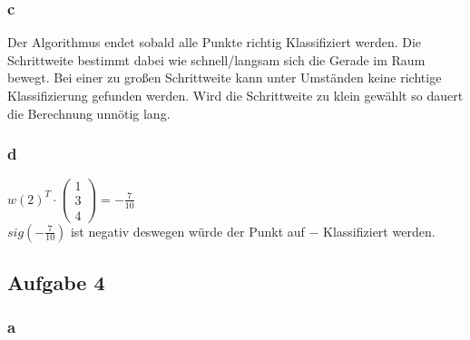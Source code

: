 \documentclass{article}
\begin{document}
	\begin{figure}[h]
	\end{figure}
	
	\subsubsection{c}
	Der Algorithmus endet sobald alle Punkte richtig Klassifiziert werden. Die Schrittweite bestimmt dabei wie schnell/langsam sich die Gerade im Raum bewegt. Bei einer zu großen Schrittweite kann unter Umständen keine richtige Klassifizierung gefunden werden. Wird die Schrittweite zu klein gewählt so dauert die Berechnung unnötig lang.
	
	\subsubsection{d} $w(2)^T \cdot 
		\begin{pmatrix}
			1 \\ 3\\ 4
		\end{pmatrix} = -\frac{7}{10}$ 
		\\ $sig(-\frac{7}{10})$ ist negativ deswegen würde der Punkt auf $-$ Klassifiziert werden.	



\subsection{Aufgabe 4}
	\subsubsection{a}
		\begin{figure}[h]
		\end{figure}
		
\end{document}
